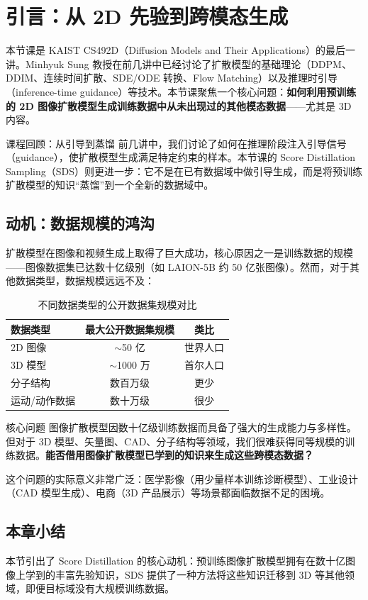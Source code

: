 \section{引言：从 2D 先验到跨模态生成}

本节课是 KAIST CS492D（Diffusion Models and Their Applications）的最后一讲。Minhyuk Sung 教授在前几讲中已经讨论了扩散模型的基础理论（DDPM、DDIM、连续时间扩散、SDE/ODE 转换、Flow Matching）以及推理时引导（inference-time guidance）等技术。本节课聚焦一个核心问题：\textbf{如何利用预训练的 2D 图像扩散模型生成训练数据中从未出现过的其他模态数据}——尤其是 3D 内容。

\begin{knowledgebox}{课程回顾：从引导到蒸馏}
前几讲中，我们讨论了如何在推理阶段注入引导信号（guidance），使扩散模型生成满足特定约束的样本。本节课的 Score Distillation Sampling（SDS）则更进一步：它不是在已有数据域中做引导生成，而是将预训练扩散模型的知识``蒸馏''到一个全新的数据域中。
\end{knowledgebox}

\subsection{动机：数据规模的鸿沟}

扩散模型在图像和视频生成上取得了巨大成功，核心原因之一是训练数据的规模——图像数据集已达数十亿级别（如 LAION-5B 约 50 亿张图像）。然而，对于其他数据类型，数据规模远远不及：

\begin{table}[H]
\centering
\begin{tabular}{lcc}
\toprule
\textbf{数据类型} & \textbf{最大公开数据集规模} & \textbf{类比} \\
\midrule
2D 图像 & $\sim$50 亿 & 世界人口 \\
3D 模型 & $\sim$1000 万 & 首尔人口 \\
分子结构 & 数百万级 & 更少 \\
运动/动作数据 & 数十万级 & 很少 \\
\bottomrule
\end{tabular}
\caption{不同数据类型的公开数据集规模对比}
\end{table}

\begin{importantbox}{核心问题}
图像扩散模型因数十亿级训练数据而具备了强大的生成能力与多样性。但对于 3D 模型、矢量图、CAD、分子结构等领域，我们很难获得同等规模的训练数据。\textbf{能否借用图像扩散模型已学到的知识来生成这些跨模态数据？}
\end{importantbox}

这个问题的实际意义非常广泛：医学影像（用少量样本训练诊断模型）、工业设计（CAD 模型生成）、电商（3D 产品展示）等场景都面临数据不足的困境。

\subsection{本章小结}

本节引出了 Score Distillation 的核心动机：预训练图像扩散模型拥有在数十亿图像上学到的丰富先验知识，SDS 提供了一种方法将这些知识迁移到 3D 等其他领域，即便目标域没有大规模训练数据。

\newpage
